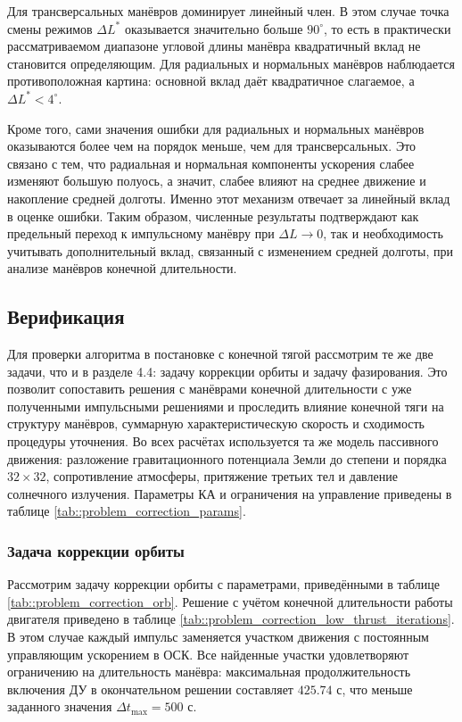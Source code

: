 Для трансверсальных манёвров доминирует линейный член. В этом случае точка смены режимов $\Delta L^*$ оказывается значительно больше $90^\circ$, то есть в практически рассматриваемом диапазоне угловой длины манёвра квадратичный вклад не становится определяющим. Для радиальных и нормальных манёвров наблюдается противоположная картина: основной вклад даёт квадратичное слагаемое, а $\Delta L^* < 4^\circ$. 

Кроме того, сами значения ошибки для радиальных и нормальных манёвров оказываются более чем на порядок меньше, чем для трансверсальных. Это связано с тем, что радиальная и нормальная компоненты ускорения слабее изменяют большую полуось, а значит, слабее влияют на среднее движение и накопление средней долготы. Именно этот механизм отвечает за линейный вклад в оценке ошибки. Таким образом, численные результаты подтверждают как предельный переход к импульсному манёвру при $\Delta L \rightarrow 0$, так и необходимость учитывать дополнительный вклад, связанный с изменением средней долготы, при анализе манёвров конечной длительности.

\subsection{Верификация}

Для проверки алгоритма в постановке с конечной тягой рассмотрим те же две задачи, что и в разделе 4.4: задачу коррекции орбиты и задачу фазирования. Это позволит сопоставить решения с манёврами конечной длительности с уже полученными импульсными решениями и проследить влияние конечной тяги на структуру манёвров, суммарную характеристическую скорость и сходимость процедуры уточнения. Во всех расчётах используется та же модель пассивного движения: разложение гравитационного потенциала Земли до степени и порядка $32 \times 32$, сопротивление атмосферы, притяжение третьих тел и давление солнечного излучения. Параметры КА и ограничения на управление приведены в таблице \ref{tab::problem_correction_params}.

\subsubsection{Задача коррекции орбиты}

Рассмотрим задачу коррекции орбиты с параметрами, приведёнными в таблице \ref{tab::problem_correction_orb}. Решение с учётом конечной длительности работы двигателя приведено в таблице \ref{tab::problem_correction_low_thrust_iterations}. В этом случае каждый импульс заменяется участком движения с постоянным управляющим ускорением в ОСК. Все найденные участки удовлетворяют ограничению на длительность манёвра: максимальная продолжительность включения ДУ в окончательном решении составляет $425.74$ с, что меньше заданного значения $\Delta t_{\text{max}}=500$ с.

